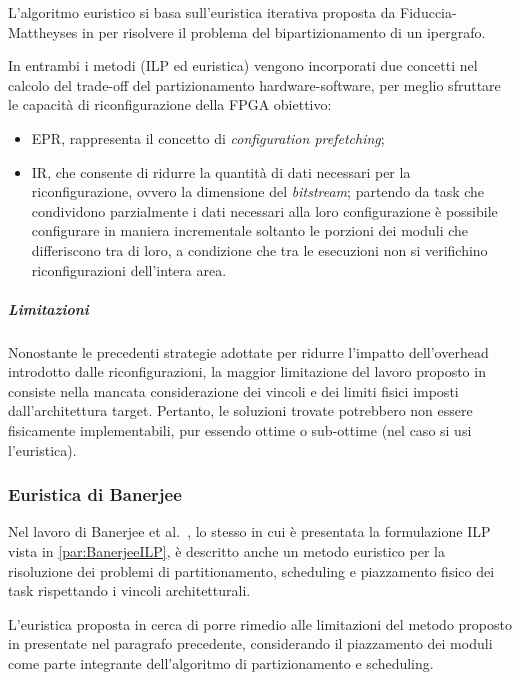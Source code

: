 L'algoritmo euristico si basa sull'euristica iterativa proposta da 
Fiduccia-Mattheyses in \cite{FiducciaMattheyses} per risolvere il problema del 
bipartizionamento di un ipergrafo.


In entrambi i metodi (\ac{ILP} ed euristica) vengono incorporati due concetti 
nel calcolo del trade-off del partizionamento hardware-software, per meglio 
sfruttare le capacità di riconfigurazione della \ac{FPGA} obiettivo:
\begin{itemize}
 \item \ac{EPR}, rappresenta il concetto di \emph{configuration prefetching};
 \item \ac{IR}, che consente di ridurre la quantità di dati necessari per la 
riconfigurazione, ovvero la dimensione del \emph{bitstream}; partendo da task 
che condividono parzialmente i dati necessari alla loro configurazione è 
possibile configurare in maniera incrementale soltanto le porzioni dei 
moduli che differiscono tra di loro, a condizione che tra le esecuzioni non si 
verifichino riconfigurazioni dell'intera area.
\end{itemize}

\subparagraph{Limitazioni}
Nonostante le precedenti strategie adottate per ridurre l'impatto dell'overhead 
introdotto dalle riconfigurazioni, la maggior limitazione del lavoro proposto 
in \cite{JeongHWSWCosynthesis} consiste nella mancata considerazione dei 
vincoli e dei limiti fisici imposti dall'architettura target. Pertanto, le 
soluzioni trovate potrebbero non essere fisicamente implementabili, pur essendo 
ottime o sub-ottime (nel caso si usi l'euristica).

\subsubsection{Euristica di Banerjee}
Nel lavoro di Banerjee et al.~\cite{BanerjeePhysicalConstraints}, lo stesso in 
cui è presentata la formulazione \ac{ILP} vista in \ref{par:BanerjeeILP}, è 
descritto anche un metodo euristico per la risoluzione dei problemi di 
partitionamento, scheduling e piazzamento fisico dei task rispettando i vincoli 
architetturali.

L'euristica proposta in \cite{BanerjeePhysicalConstraints} cerca di porre 
rimedio alle limitazioni del metodo proposto in \cite{JeongHWSWCosynthesis} 
presentate nel paragrafo precedente, considerando il piazzamento dei moduli 
come parte integrante dell'algoritmo di partizionamento e scheduling.

